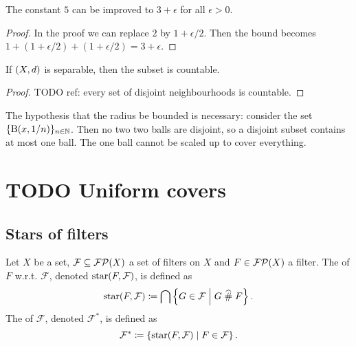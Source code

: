 \begin{corollary}
The constant $5$ can be improved to $3+\epsilon$ for all $\epsilon >0$.
\end{corollary}
\begin{proof}
In the proof we can replace $2$ by $1+\epsilon/2$. Then the bound becomes $1+(1+\epsilon/2) + (1+\epsilon/2) = 3+\epsilon$.
\end{proof}
\begin{corollary}
If $\left( X,d \right)$ is separable, then the subset is countable.
\end{corollary}
\begin{proof}
TODO ref: every set of disjoint neighbourhoods is countable.
\end{proof}

\begin{example}
The hypothesis that the radius be bounded is necessary: consider the set $\{\operatorname{B}(x, 1/n)\}_{n\in \mathbb{N}}$. Then no two two balls are disjoint, so a disjoint subset contains at most one ball. The one ball cannot be scaled up to cover everything.
\end{example}

\section{TODO Uniform covers}
\subsection{Stars of filters}
\begin{definition}
Let $X$ be a set, $\mathcal{F} \subseteq \operatorname{\mathcal{FP}}(X)$ a set of filters on $X$ and $F\in\operatorname{\mathcal{FP}}(X)$ a filter. The  of $F$ w.r.t. $\mathcal{F}$, denoted $\operatorname{star}(F,\mathcal{F})$, is defined as
\[ \operatorname{star}(F,\mathcal{F}) \coloneqq \bigcap \left\{ G\in \mathcal{F} \;\middle|\; G \mathrel{\widehat{\#}} F \right\}. \]
The  of $\mathcal{F}$, denoted $\mathcal{F}^*$, is defined as
\[ \mathcal{F}^* \coloneqq \left\{ \operatorname{star}(F,\mathcal{F}) \;\middle|\; F\in \mathcal{F} \right\}. \]
\end{definition}

